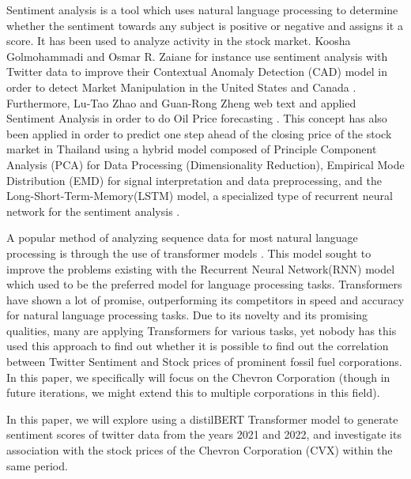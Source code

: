 \documentclass[12pt, letterpaper, titlepage]{article}
\newcommand{\jy}[1]{\textcolor{blue}{JY: #1}}
\begin{document}
Sentiment analysis \citep{medhat2014sentiment} is a tool which uses natural language processing to determine whether the sentiment towards any subject is positive or negative and assigns it a score. It has been used to analyze activity in the stock market. Koosha Golmohammadi and Osmar R. Zaiane for instance use sentiment analysis with Twitter data to improve their Contextual Anomaly Detection (CAD) model in order to detect Market Manipulation in the United States and Canada \citep{golmohammadi2017sentiment}. Furthermore, Lu-Tao Zhao and Guan-Rong Zheng web text and applied Sentiment Analysis in order to do Oil Price forecasting \citep{zhao2019forecasting}. This concept has also been applied in order to predict one step ahead of the closing price of the stock market in Thailand using a hybrid model composed of Principle Component Analysis (PCA) for Data Processing (Dimensionality Reduction), Empirical Mode Distribution (EMD) for signal interpretation and data preprocessing, and the Long-Short-Term-Memory(LSTM) model, a specialized type of recurrent neural network for the sentiment analysis \citep{srijiranon2022hybrid}.

A popular method of analyzing sequence data for most natural language processing is through the use of transformer models  \citep{vaswani2017attention}. This model sought to improve the problems existing with the Recurrent Neural Network(RNN) model which used to be the preferred model for language processing tasks. Transformers have shown a lot of promise, outperforming its competitors in speed and accuracy for natural language processing tasks. Due to its novelty and its promising qualities, many are applying Transformers for various tasks, yet nobody has this used this approach to find out whether it is possible to find out the correlation between Twitter Sentiment and Stock prices of prominent fossil fuel corporations. In this paper, we specifically will focus on the Chevron Corporation (though in future iterations, we might extend this to multiple corporations in this field).

In this paper, we will explore using a distilBERT Transformer model to generate sentiment scores of twitter data from the years 2021 and 2022, and investigate its association with the stock prices of the Chevron Corporation (CVX) within the same period.

\end{document}
